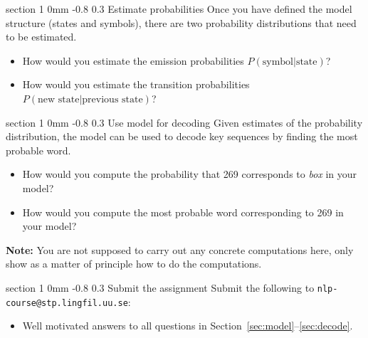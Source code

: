 \documentclass[11pt]{article}
\makeatletter
\newcommand{\newsec}[2]{\section{#1}\label{sec:#2}\noindent}
\renewcommand{\section}{\@startsection
{section}%
{1}%
{0mm}%
{-0.8\baselineskip}%
{0.3\baselineskip}%
{\bfseries\large}}%
\makeatother
\begin{document}
\newsec{Estimate probabilities}{estimate}%
Once you have defined the model structure (states and symbols), there are two probability distributions that need to be estimated.
\begin{itemize}[noitemsep,topsep=0.2cm]
\item How would you estimate the emission probabilities $P(\mbox{symbol}|\mbox{state})$?
\item How would you estimate the transition probabilities $P(\mbox{new state}|\mbox{previous state})$?
\end{itemize}

\newsec{Use model for decoding}{decode}%
Given estimates of the probability distribution, the model can be used to decode key sequences by finding the most probable word.
\begin{itemize}[noitemsep,topsep=0.2cm]
\item How would you compute the probability that 269 corresponds to {\em box} in your model?
\item How would you compute the most probable word corresponding to 269 in your model?
\end{itemize}
\textbf{Note:} You are not supposed to carry out any concrete computations here, only show as a matter of principle how to do the computations.

\newsec{Submit the assignment}{submit}%
Submit the following to {\tt nlp-course@stp.lingfil.uu.se}: 
\begin{itemize}[noitemsep,topsep=0.2cm]
\item Well motivated answers to all questions in Section~\ref{sec:model}--\ref{sec:decode}.
\end{itemize}
\end{document}
